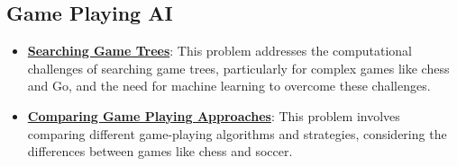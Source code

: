 \documentclass{article}%
\begin{document}
\subsection{Game Playing AI}%
\label{subsec:GamePlayingAI}%
\begin{itemize}[leftmargin=*]%
\item \href{\url{https://purdue.brightspace.com/d2l/common/assets/pdfjs-d2l-dist/1.0.14-legacy/web/viewer.html?file=\%252Fcontent\%252Fenforced\%252F1095467-wl.202510.CS.24300.001\%252F02L2-Intro.pdf\%253Fou\%253D1095467\&lang=en-us\&container=d2l-fileviewer-rendered-pdf\&fullscreen=d2l-fileviewer-rendered-pdf-dialog\&height=667}#page=11}{\textbf{Searching Game Trees}}: This problem addresses the computational challenges of searching game trees, particularly for complex games like chess and Go, and the need for machine learning to overcome these challenges.%
\item \href{\url{https://purdue.brightspace.com/d2l/common/assets/pdfjs-d2l-dist/1.0.14-legacy/web/viewer.html?file=\%252Fcontent\%252Fenforced\%252F1095467-wl.202510.CS.24300.001\%252F02L2-Intro.pdf\%253Fou\%253D1095467\&lang=en-us\&container=d2l-fileviewer-rendered-pdf\&fullscreen=d2l-fileviewer-rendered-pdf-dialog\&height=667}#page=27}{\textbf{Comparing Game Playing Approaches}}: This problem involves comparing different game-playing algorithms and strategies, considering the differences between games like chess and soccer.%
\end{itemize}

%
\end{document}
